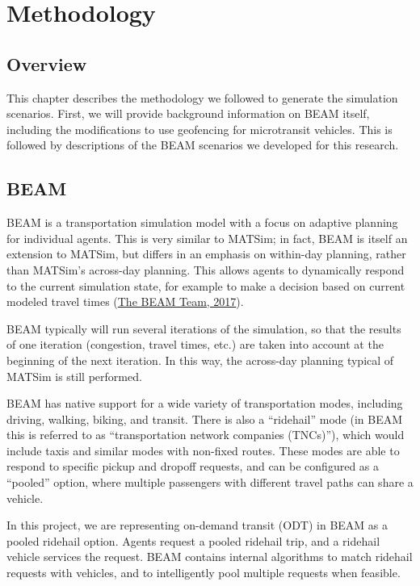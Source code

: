 \documentclass[
]{article}
\begin{document}
\hypertarget{methodology}{%
\section{Methodology}\label{methodology}}

\hypertarget{overview-1}{%
\subsection{Overview}\label{overview-1}}

This chapter describes the methodology we followed to generate the simulation scenarios. First, we will provide background information on BEAM itself, including the modifications to use geofencing for microtransit vehicles. This is followed by descriptions of the BEAM scenarios we developed for this research.

\hypertarget{beam}{%
\subsection{BEAM}\label{beam}}

BEAM is a transportation simulation model with a focus on adaptive planning for individual agents. This is very similar to MATSim; in fact, BEAM is itself an extension to MATSim, but differs in an emphasis on within-day planning, rather than MATSim's across-day planning. This allows agents to dynamically respond to the current simulation state, for example to make a decision based on current modeled travel times (\protect\hyperlink{ref-beamdocs}{The BEAM Team, 2017}).

BEAM typically will run several iterations of the simulation, so that the results of one iteration (congestion, travel times, etc.) are taken into account at the beginning of the next iteration. In this way, the across-day planning typical of MATSim is still performed.

BEAM has native support for a wide variety of transportation modes, including driving, walking, biking, and transit. There is also a ``ridehail'' mode (in BEAM this is referred to as ``transportation network companies (TNCs)''), which would include taxis and similar modes with non-fixed routes. These modes are able to respond to specific pickup and dropoff requests, and can be configured as a ``pooled'' option, where multiple passengers with different travel paths can share a vehicle.

In this project, we are representing on-demand transit (ODT) in BEAM as a pooled ridehail option. Agents request a pooled ridehail trip, and a ridehail vehicle services the request. BEAM contains internal algorithms to match ridehail requests with vehicles, and to intelligently pool multiple requests when feasible.
\end{document}
